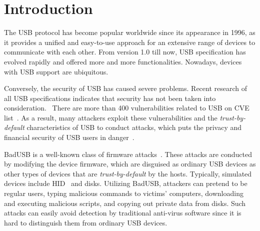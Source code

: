 \section{Introduction}
\label{sec:introduction}

The \ac{USB} protocol has become popular worldwide
since its appearance in 1996, as it provides a unified and easy-to-use approach for an
extensive range of devices to communicate with each other.  From version 1.0 till
now, \ac{USB} specification has evolved rapidly and offered more and more
functionalities.  Nowadays, devices with \ac{USB} support are ubiquitous.

Conversely, the security of \ac{USB} has caused severe problems.
Recent research of all USB specifications indicates that security has not been taken into consideration.~\cite{sok}  There are more than 400
vulnerabilities related to \ac{USB} on CVE list~\cite{website:CVE-list}.  As a
result, many attackers exploit these vulnerabilities and the
\textit{trust-by-default} characteristics of \ac{USB} to conduct attacks, which puts
the privacy and financial security of \ac{USB} users in danger~\cite{sok}.

BadUSB is a well-known class of firmware attacks~\cite{badusb}.  These attacks
are conducted by modifying the device firmware, which are disguised
 as ordinary \ac{USB} devices as other types of devices that are \textit{trust-by-default}
by the hosts.  Typically, simulated devices include \ac{HID}~\cite{hid} and disks.  Utilizing BadUSB,
attackers can pretend to be regular users, typing malicious commands to
victims' computers, downloading and executing malicious scripts, and copying out
private data from disks.  Such attacks can easily avoid detection by traditional
anti-virus software since it is hard to distinguish them from ordinary \ac{USB}
devices.

